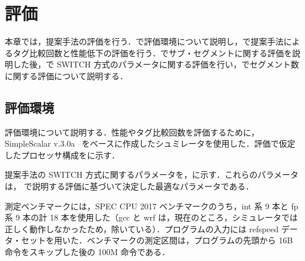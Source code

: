 
\chapter{評価}
\label{sec:eval}
本章では，提案手法の評価を行う．で評価環境について説明し，で提案手法によるタグ比較回数と性能低下の評価を行う．でサブ・セグメントに関する評価を説明した後，で SWITCH 方式のパラメータに関する評価を行い，でセグメント数に関する評価について説明する．

\section{評価環境}
\label{sec:eval_env}
評価環境について説明する．性能やタグ比較回数を評価するために，SimpleScalar v.3.0a~\cite{SimpleScalar} をベースに作成したシュミレータを使用した．評価で仮定したプロセッサ構成をに示す．

提案手法の SWITCH 方式に関するパラメータを，に示す．これらのパラメータは， で説明する評価に基づいて決定した最適なパラメータである．

測定ベンチマークには，SPEC CPU 2017 ベンチマークのうち，int 系 9 本と fp 系 9 本の計 18 本を使用した（gcc と wrf は，現在のところ，シミュレータでは正しく動作しなかったため，除いている）．プログラムの入力には refspeed データ・セットを用いた．ベンチマークの測定区間は，プログラムの先頭から 16B 命令をスキップした後の 100M 命令である．

